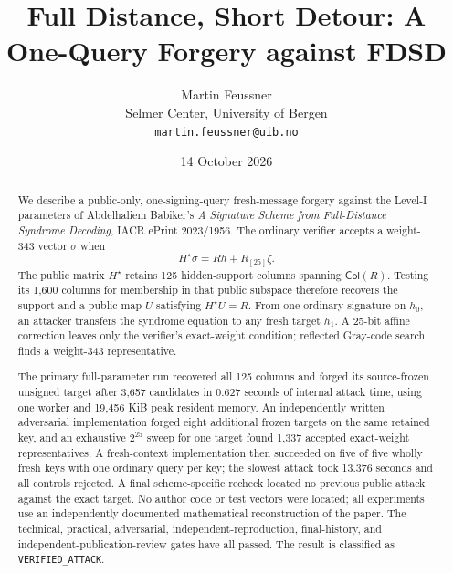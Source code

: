 \documentclass[10pt,a4paper]{article}
\title{\bfseries Full Distance, Short Detour: A One-Query Forgery against FDSD}
\author{Martin Feussner\\
\small Selmer Center, University of Bergen\\
\small \texttt{martin.feussner@uib.no}}
\date{14 October 2026}
\newcommand{\Col}{\mathsf{Col}}
\begin{document}
\maketitle

\noindent{}

\begin{abstract}
We describe a public-only, one-signing-query fresh-message forgery against the
Level-I parameters of Abdelhaliem Babiker's \emph{A Signature Scheme from
Full-Distance Syndrome Decoding}, IACR ePrint 2023/1956. The ordinary verifier
accepts a weight-343 vector $\sigma$ when
\[
  H^\star\sigma=Rh+R_{[25]}\zeta.
\]
The public matrix $H^\star$ retains 125 hidden-support columns spanning
$\Col(R)$. Testing its 1,600 columns for membership in that public subspace
therefore recovers the support and a public map $U$ satisfying
$H^\star U=R$. From one ordinary signature on $h_0$, an attacker transfers the
syndrome equation to any fresh target $h_1$. A 25-bit affine correction leaves
only the verifier's exact-weight condition; reflected Gray-code search finds a
weight-343 representative.

The primary full-parameter run recovered all 125 columns and forged its
source-frozen unsigned target after 3,657 candidates in 0.627 seconds of
internal attack time, using one worker and 19,456 KiB peak resident memory.
An independently written adversarial implementation forged eight additional
frozen targets on the same retained key, and an exhaustive $2^{25}$ sweep for
one target found 1,337 accepted exact-weight representatives. A fresh-context
implementation then succeeded on five of five wholly fresh keys with one
ordinary query per key; the slowest attack took 13.376 seconds and all controls
rejected. A final scheme-specific recheck located no previous public attack
against the exact target. No author code or test vectors were located; all
experiments use an independently documented mathematical reconstruction of
the paper. The technical, practical, adversarial, independent-reproduction,
final-history, and independent-publication-review gates have all passed. The
result is classified as \texttt{VERIFIED\_ATTACK}.
\end{abstract}
\end{document}
